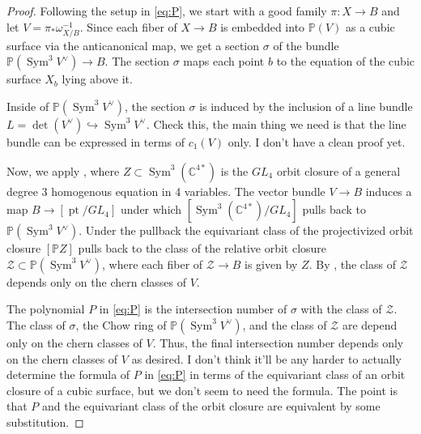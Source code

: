 \documentclass[12 pt]{amsart}
\newcommand{\<}{\left\langle}
\renewcommand{\>}{\right\rangle}
\begin{document}
\begin{proof}
Following the setup in \eqref{eq:P}, we start with a good family $\pi: X\to B$ and let $V=\pi_{*}\omega_{X/B}^{-1}$. Since each fiber of $X\to B$ is embedded into $\mathbb{P}(V)$ as a cubic surface via the anticanonical map, we get a section $\sigma$ of the bundle $\mathbb{P}(\operatorname{Sym}^3 V^{\vee})\to B$. The section $\sigma$ maps each point $b$ to the equation of the cubic surface $X_b$ lying above it.

Inside of $\mathbb{P}(\operatorname{Sym}^3 V^{\vee})$, the section $\sigma$ is induced by the inclusion of a line bundle $L=\det(V^{\vee})\hookrightarrow \operatorname{Sym}^3 V^{\vee}$. {\color{red} Check this, the main thing we need is that the line bundle can be expressed in terms of $c_1(V)$ only. I don't have a clean proof yet.}

Now, we apply , where $Z\subset \operatorname{Sym}^3(\mathbb{C}^{4\ast})$ is the $GL_4$ orbit closure of a general degree 3 homogenous equation in 4 variables. The vector bundle $V\to B$ induces a map $B\to [\operatorname{pt}/GL_4]$ under which $[\operatorname{Sym}^3(\mathbb{C}^{4\ast})/GL_4]$ pulls back to $\mathbb{P}(\operatorname{Sym}^3 V^{\vee})$. Under the pullback the equivariant class of the projectivized orbit closure $[\mathbb{P}Z]$ pulls back to the class of the relative orbit closure $\mathcal{Z}\subset \mathbb{P}(\operatorname{Sym}^3 V^{\vee})$, where each fiber of $\mathcal{Z}\to B$ is given by $Z$. By , the class of $\mathcal{Z}$ depends only on the chern classes of $V$. 

The polynomial $P$ in \eqref{eq:P} is the intersection number of $\sigma$ with the class of $\mathcal{Z}$. The class of $\sigma$, the Chow ring of $\mathbb{P}(\operatorname{Sym}^3 V^{\vee})$, and the class of $\mathcal{Z}$ are depend only on the chern classes of $V$. Thus, the final intersection number depends only on the chern classes of $V$ as desired. 
{\color{red} I don't think it'll be any harder to actually determine the formula of $P$ in \eqref{eq:P} in terms of the equivariant class of an orbit closure of a cubic surface, but we don't seem to need the formula. The point is that $P$ and the equivariant class of the orbit closure are equivalent by some substitution.}
\end{proof}


\end{document}

